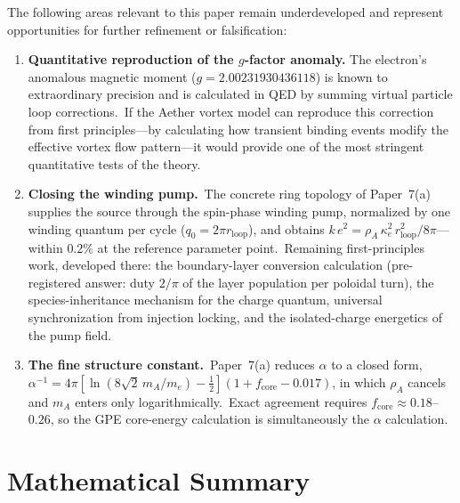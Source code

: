 ﻿\documentclass[12pt,letterpaper]{article}
\newcommand{\rhoa}{\rho_{\!A}}
\begin{document}
The following areas relevant to this paper remain underdeveloped and represent opportunities for further refinement or falsification:

\begin{enumerate}[leftmargin=2em]
  \item \textbf{Quantitative reproduction of the $g$-factor anomaly.} The electron's anomalous magnetic
    moment ($g = 2.00231930436118$) is known to extraordinary precision and is calculated
    in QED by summing virtual particle loop corrections.\ If the Aether vortex model can
    reproduce this correction from first principles---by calculating how transient binding
    events modify the effective vortex flow pattern---it would provide one of the most
    stringent quantitative tests of the theory.

  \item \textbf{Closing the winding pump.}\
    The concrete ring topology of Paper~7(a)~\cite{otto-boundcore} supplies the
    source through the spin-phase winding pump, normalized by one winding
    quantum per cycle ($q_0 = 2\pi r_{\mathrm{loop}}$), and obtains
    $k\,e^2 = \rhoa\,\kappa_e^2\,r_{\mathrm{loop}}^2/8\pi$---within $0.2\%$ at
    the reference parameter point.\ Remaining first-principles work, developed
    there: the boundary-layer conversion calculation (pre-registered answer:
    duty $2/\pi$ of the layer population per poloidal turn), the
    species-inheritance mechanism for the charge quantum, universal
    synchronization from injection locking, and the isolated-charge energetics
    of the pump field.

  \item \textbf{The fine structure constant.}\ Paper~7(a) reduces $\alpha$ to a
    closed form,
    $\alpha^{-1} = 4\pi[\ln(8\sqrt{2}\,m_A/m_e) - \tfrac12](1+f_{\mathrm{core}}-0.017)$,
    in which $\rhoa$ cancels and $m_A$ enters only logarithmically.\ Exact
    agreement requires $f_{\mathrm{core}} \approx 0.18$--$0.26$, so the GPE
    core-energy calculation is simultaneously the $\alpha$ calculation.

\end{enumerate}



\section{Mathematical Summary}
\label{sec:em-math-summary}
\end{document}
